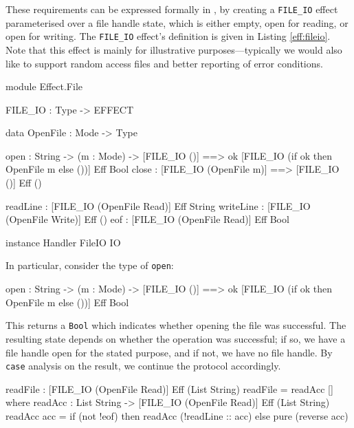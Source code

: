 These requirements can be expressed formally in \effects{}, by creating
a \texttt{FILE\_IO} effect parameterised over a file handle state, which
is either empty, open for reading, or open for writing. The \texttt{FILE\_IO}
effect's definition is given in Listing \ref{eff:fileio}. Note that this
effect is mainly for illustrative purposes---typically we would also like to
support random access files and better reporting of error conditions.

\begin{code}[float=h,frame=single, caption={File I/O Effect}, label=eff:fileio]
module Effect.File

FILE_IO : Type -> EFFECT

data OpenFile : Mode -> Type

open  : String -> (m : Mode) -> 
        { [FILE_IO ()] ==> 
          {ok} [FILE_IO (if ok then OpenFile m else ())] } Eff Bool
close : { [FILE_IO (OpenFile m)] ==> [FILE_IO ()] } Eff ()

readLine  : { [FILE_IO (OpenFile Read)] } Eff String 
writeLine : { [FILE_IO (OpenFile Write)] } Eff ()
eof       : { [FILE_IO (OpenFile Read)] } Eff Bool 

instance Handler FileIO IO
\end{code}

\noindent
In particular, consider the type of \texttt{open}:

\begin{code}
open  : String -> (m : Mode) -> 
        { [FILE_IO ()] ==> 
          {ok} [FILE_IO (if ok then OpenFile m else ())] } Eff Bool
\end{code}

\noindent
This returns a \texttt{Bool} which indicates whether opening the file was
successful. The resulting state depends on whether the operation was successful;
if so, we have a file handle open for the stated purpose, and if not, we have
no file handle. By \texttt{case} analysis on the result, we continue the
protocol accordingly.

\begin{code}[float=h,frame=single, caption={Reading a File}, label=eff:readfile]
readFile : { [FILE_IO (OpenFile Read)] } Eff (List String)
readFile = readAcc [] where
    readAcc : List String -> { [FILE_IO (OpenFile Read)] }
              Eff (List String)
    readAcc acc = if (not !eof)
                     then readAcc (!readLine :: acc)
                     else pure (reverse acc)
\end{code}

